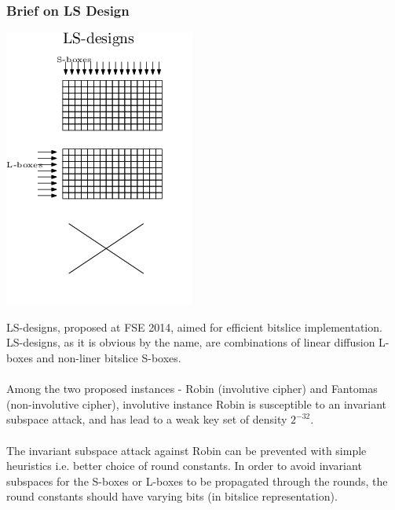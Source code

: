\documentclass[preprint]{transcrypto}
\begin{document}
\subsubsection{Brief on LS Design}
\begin{center}
  \includegraphics[]{ls.png}  
\end{center}
LS-designs, proposed at FSE 2014, aimed for efficient bitslice implementation. LS-designs, as it is obvious by the name, are combinations of linear diffusion L-boxes and non-liner bitslice S-boxes. 
\\\\
Among the two proposed instances - Robin (involutive cipher) and Fantomas (non-involutive cipher), involutive instance Robin is susceptible to an invariant subspace attack, and has lead to a weak key set of density $2^{-32}$. 
\\\\
The invariant subspace attack against Robin can be prevented with simple heuristics i.e. better choice of round constants. In order to avoid invariant subspaces for the S-boxes or L-boxes to be propagated through the rounds, the round constants should have varying bits (in bitslice representation).
\end{document}
